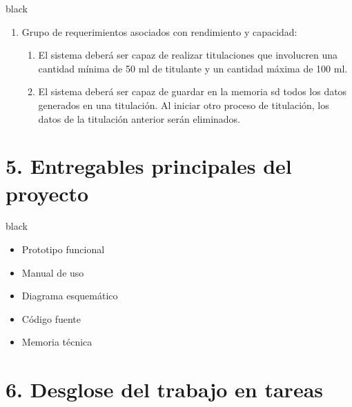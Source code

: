 \documentclass[11pt]{charter}
\begin{document}
\begin{consigna}{black}
\begin{enumerate}
\item Grupo de requerimientos asociados con rendimiento y capacidad:
	\begin{enumerate}
	\item El sistema deberá ser capaz de realizar titulaciones que involucren una cantidad mínima de 50 ml de titulante y un cantidad máxima de 100 ml.
	\item El sistema deberá ser capaz de guardar en la memoria sd todos los datos generados en una titulación. Al iniciar otro proceso de titulación, los datos de la titulación anterior serán eliminados.
	\end{enumerate}
\end{enumerate}
\end{consigna}

\section{5. Entregables principales del proyecto}
\label{sec:entregables}

\begin{consigna}{black} 
\begin{itemize}
\item Prototipo funcional
\item Manual de uso
\item Diagrama esquemático
\item Código fuente
\item Memoria técnica
\end{itemize}
\end{consigna}

\section{6. Desglose del trabajo en tareas}
\label{sec:wbs}
\end{document}
